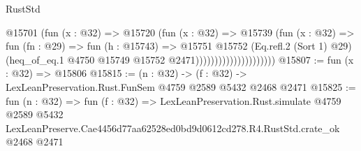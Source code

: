 \begin{lexlean}{RustStd}
\begin{coremodule}
                                    @15701
                                      (fun (x : @32) =>
                                      @15720
                                        (fun (x : @32) =>
                                        @15739
                                          (fun (x : @32) =>
                                          fun (fn : @29) =>
                                          fun (h : @15743) =>
                                          @15751
                                            @15752
                                            (Eq.refl.{2} (Sort 1) @29)
                                            (heq_of_eq.{1}
                                              @4750
                                              @15749
                                              @15752
                                              @2471)))))))))))))))))))))
@15807 := fun (x : @32) => @15806
@15815 := (n : @32) -> (f : @32) -> LexLeanPreservation.Rust.FunSem @4759 @2589 @5432 @2468 @2471
@15825 := fun (n : @32) =>
  fun (f : @32) =>
  LexLeanPreservation.Rust.simulate
    @4759
    @2589
    @5432
    LexLeanPreserve.Cae4456d77aa62528ed0bd9d0612cd278.R4.RustStd.crate_ok
    @2468
    @2471
\end{coremodule}
\end{lexlean}
